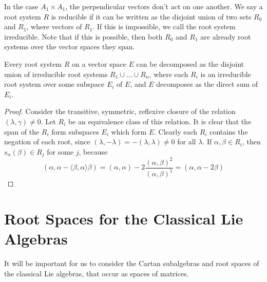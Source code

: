 In the case $A_1 \times A_1$, the perpendicular vectors don't act on one another. We say a root system $R$ is reducible if it can be written as the disjoint union of two sets $R_0$ and $R_1$, where vectors of $R_1$. If this is impossible, we call the root system irreducible. Note that if this is possible, then both $R_0$ and $R_1$ are already root systems over the vector spaces they span.

\begin{lemma}
    Every root system $R$ on a vector space $E$ can be decomposed as the disjoint union of irreducible root systems $R_1 \cup \dots \cup R_n$, where each $R_i$ is an irreducible root system over some subspace $E_i$ of $E$, and $E$ decomposes as the direct sum of $E_i$.
\end{lemma}
\begin{proof}
    Consider the transitive, symmetric, reflexive closure of the relation $(\lambda, \gamma) \neq 0$. Let $R_i$ be an equivalence class of this relation. It is clear that the span of the $R_i$ form subspaces $E_i$ which form $E$. Clearly each $R_i$ contains the negation of each root, since $(\lambda, -\lambda) = - (\lambda, \lambda) \neq 0$ for all $\lambda$. If $\alpha, \beta \in R_i$, then $s_\alpha(\beta) \in R_j$ for some $j$, because
    \[ (\alpha, \alpha - \langle \beta, \alpha \rangle \beta ) = (\alpha, \alpha) - 2 \frac{(\alpha, \beta)^2}{(\alpha, \beta)^1} = (\alpha, \alpha - 2\beta) \]
\end{proof}



\section{Root Spaces for the Classical Lie Algebras}

It will be important for us to consider the Cartan subalgebras and root spaces of the classical Lie algebras, that occur as spaces of matrices.

